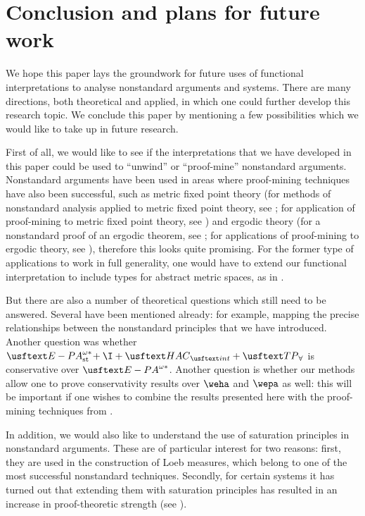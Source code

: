 \section{Conclusion and plans for future work}

We hope this paper lays the groundwork for future uses of functional interpretations to analyse nonstandard arguments and systems. There are many directions, both theoretical and applied, in which one could further develop this research topic. We conclude this paper by mentioning a few possibilities which we would like to take up in future research.

First of all, we would like to see if the interpretations that we have developed in this paper could be used to ``unwind'' or ``proof-mine'' nonstandard arguments. Nonstandard arguments have been used in areas where proof-mining techniques have also been successful, such as metric fixed point theory (for methods of nonstandard analysis applied to metric fixed point theory, see \cite{aksoykhamsi90, kirk03}; for application of proof-mining to metric fixed point theory, see \cite{briseid09, gerhardy06, kohlenbach05, kohlenbachleustean03, kohlenbachleustean10, leustean07}) and ergodic theory (for a nonstandard proof of an ergodic theorem, see \cite{kamae82}; for applications of proof-mining to ergodic theory, see \cite{avigad09, avigadgerhardytowsner10, gerhardy08, gerhardy10, kohlenbach11, kohlenbachleustean09, safarik11}), therefore this looks quite promising. For the former type of applications to work in full generality, one would have to extend our functional interpretation to include types for abstract metric spaces, as in \cite{gerhardykohlenbach08, kohlenbach05b}.

But there are also a number of theoretical questions which still need to be answered. Several have been mentioned already: for example, mapping the precise relationships between the nonstandard principles that we have introduced. Another question was whether $\epaststar + \I + \HAC_\intern + \TPA$ is conservative over $\epastar$. Another question is whether our methods allow one to prove conservativity results over $\weha$ and $\wepa$ as well: this will be important if one wishes to combine the results presented here with the proof-mining techniques from \cite{Kohlenbach08}. 

In addition, we would also like to understand the use of saturation principles in nonstandard arguments. These are of particular interest for two reasons: first, they are used in the construction of Loeb measures, which belong to one of the most successful nonstandard techniques. Secondly, for certain systems it has turned out that extending them with saturation principles has resulted in an increase in proof-theoretic strength (see \cite{hensonkeisler86, keisler07}). 

